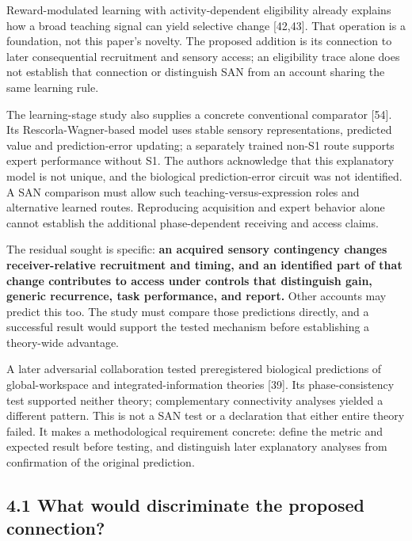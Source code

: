 \documentclass[
  american,
  11pt,
  letterpaper,
]{article}
\begin{document}
Reward-modulated learning with activity-dependent eligibility already explains how a broad teaching signal can yield selective change {[}42,43{]}. That operation is a foundation, not this paper's novelty. The proposed addition is its connection to later consequential recruitment and sensory access; an eligibility trace alone does not establish that connection or distinguish SAN from an account sharing the same learning rule.

The learning-stage study also supplies a concrete conventional comparator {[}54{]}. Its Rescorla-Wagner-based model uses stable sensory representations, predicted value and prediction-error updating; a separately trained non-S1 route supports expert performance without S1. The authors acknowledge that this explanatory model is not unique, and the biological prediction-error circuit was not identified. A SAN comparison must allow such teaching-versus-expression roles and alternative learned routes. Reproducing acquisition and expert behavior alone cannot establish the additional phase-dependent receiving and access claims.

The residual sought is specific: \textbf{an acquired sensory contingency changes receiver-relative recruitment and timing, and an identified part of that change contributes to access under controls that distinguish gain, generic recurrence, task performance, and report.} Other accounts may predict this too. The study must compare those predictions directly, and a successful result would support the tested mechanism before establishing a theory-wide advantage.

A later adversarial collaboration tested preregistered biological predictions of global-workspace and integrated-information theories {[}39{]}. Its phase-consistency test supported neither theory; complementary connectivity analyses yielded a different pattern. This is not a SAN test or a declaration that either entire theory failed. It makes a methodological requirement concrete: define the metric and expected result before testing, and distinguish later explanatory analyses from confirmation of the original prediction.

\par\ifdim\dimexpr\pagegoal-\pagetotal\relax<350pt\newpage\fi
\subsection{4.1 What would discriminate the proposed connection?}\label{what-would-discriminate-the-proposed-connection}
\end{document}
